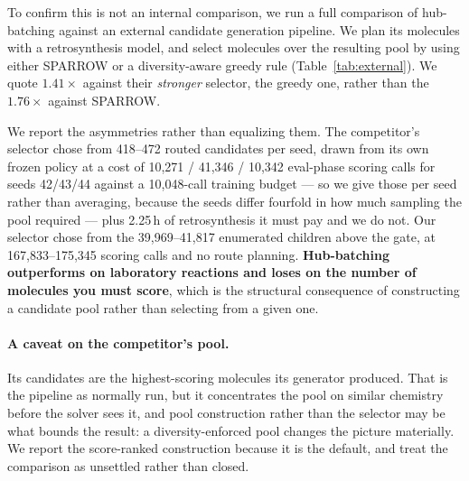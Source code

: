 \documentclass{article}
\newcommand{\checkval}[1]{#1}
\begin{document}
To confirm this is not an internal comparison, we run a full comparison of hub-batching against an external candidate generation pipeline. We plan its molecules with a retrosynthesis model, and select molecules over the resulting pool by using either SPARROW or a diversity-aware greedy rule (Table~\ref{tab:external}). We quote \checkval{$1.41\times$} against their \emph{stronger} selector, the greedy one, rather than the \checkval{$1.76\times$} against SPARROW.


We report the asymmetries rather than equalizing them. The competitor's selector chose
from \checkval{418--472} routed candidates per seed, drawn from its own frozen policy at a
cost of \checkval{10{,}271} / \checkval{41{,}346} / \checkval{10{,}342} eval-phase scoring
calls for seeds 42/43/44 against a \checkval{10{,}048}-call training budget --- so we give
those per seed rather than averaging, because the seeds differ fourfold in how much
sampling the pool required --- plus \checkval{2.25\,h} of retrosynthesis it must pay and we
do not. Our selector chose from the \checkval{39{,}969--41{,}817} enumerated children above
the gate, at \checkval{167{,}833--175{,}345} scoring calls and no route planning.
\textbf{Hub-batching outperforms on laboratory reactions and loses on the number of
molecules you must score}, which is the structural consequence of constructing a candidate
pool rather than selecting from a given one.

\paragraph{A caveat on the competitor's pool.}
Its candidates are the highest-scoring molecules its generator produced. That is the
pipeline as normally run, but it concentrates the pool on similar chemistry before the
solver sees it, and pool construction rather than the selector may be what bounds the
result: a diversity-enforced pool changes the picture materially. We report the
score-ranked construction because it is the default, and treat the comparison as unsettled
rather than closed.
\end{document}
